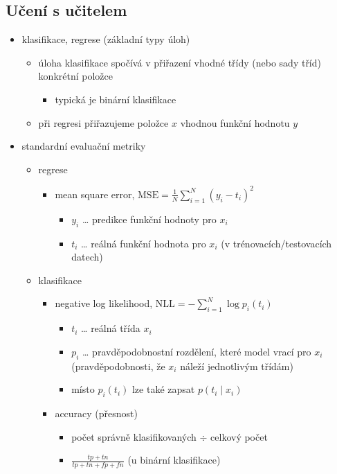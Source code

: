\subsection{Učení s učitelem}
\begin{itemize}
\item klasifikace, regrese (základní typy úloh)
\begin{itemize}
\item úloha klasifikace spočívá v přiřazení vhodné třídy (nebo sady tříd) konkrétní položce
\begin{itemize}
\item typická je binární klasifikace
\end{itemize}
\item při regresi přiřazujeme položce $x$ vhodnou funkční hodnotu $y$
\end{itemize}
\item standardní evaluační metriky
\begin{itemize}
\item regrese
\begin{itemize}
\item mean square error, $\mathrm{MSE}=\frac1N\sum_{i=1}^N (y_i-t_i)^2$
\begin{itemize}
\item $y_i$ \dots{} predikce funkční hodnoty pro $x_i$
\item $t_i$ \dots{} reálná funkční hodnota pro $x_i$ (v trénovacích/testovacích datech)
\end{itemize}
\end{itemize}
\item klasifikace
\begin{itemize}
\item negative log likelihood, $\mathrm{NLL}=-\sum_{i=1}^N \log p_i(t_i)$
\begin{itemize}
\item $t_i$ \dots{} reálná třída $x_i$
\item $p_i$ \dots{} pravděpodobnostní rozdělení, které model vrací pro $x_i$ (pravděpodobnosti, že $x_i$ náleží jednotlivým třídám)
\item místo $p_i(t_i)$ lze také zapsat $p(t_i\mid x_i)$
\end{itemize}
\item accuracy (přesnost)
\begin{itemize}
\item počet správně klasifikovaných $\div$ celkový počet
\item $\frac{tp+tn}{tp+tn+fp+fn}$ (u binární klasifikace)

\end{itemize}
\end{itemize}
\end{itemize}
\end{itemize}
